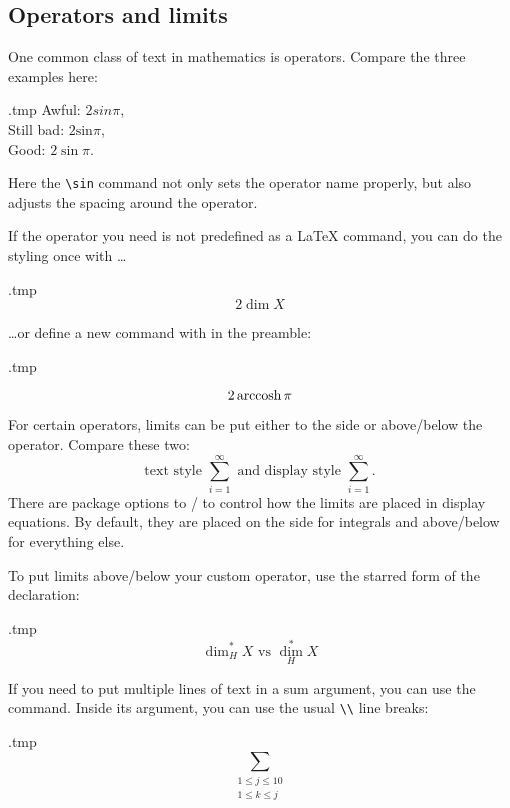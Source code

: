 %
%
\subsection{Operators and limits}\label{sec:operators}
One common class of text in mathematics is operators.
Compare the three examples here:
%
\begin{VerbatimOut}{\jobname.tmp}
Awful: $2 sin \pi$,\\
Still bad: $2 \textrm{sin} \pi$,\\
Good: $2 \sin \pi$.
\end{VerbatimOut}
\ShowExample
Here the \verb|\sin| command not only sets the operator name properly,
but also adjusts the spacing around the operator.

If the operator you need is not predefined as a \LaTeX{} command,
you can do the styling once with \dots
%
\begin{VerbatimOut}{\jobname.tmp}
\[
2 \operatorname{dim} X
\]
\end{VerbatimOut}
\ShowExample
%
\dots{}or define a new command with  in the preamble:
%
\begin{VerbatimOut}{\jobname.tmp}

\[
2 \operatorname{arccosh} \pi
\]
\end{VerbatimOut}
\ShowExample

For certain operators, limits can be put either to the side or above/below the operator.
Compare these two:
\[
\text{text style }\textstyle \sum_{i=1}^\infty
\text{ and display style }\displaystyle \sum_{i=1}^\infty.
\]
There are package options to /
to control how the limits are placed in display equations.
By default, they are placed on the side for integrals and above/below for everything else.

To put limits above/below your custom operator, use the starred form of the declaration:
%
\begin{VerbatimOut}{\jobname.tmp}
\[
\operatorname{dim}_H^\ast X
\text{ vs }
\operatorname*{dim}_H^\ast X
\]
\end{VerbatimOut}
\ShowExample

If you need to put multiple lines of text in a sum argument,
you can use the  command.
Inside its argument, you can use the usual \verb|\\| line breaks:
%
\begin{VerbatimOut}{\jobname.tmp}
\[
\sum_{\substack{1 \leq j \leq 10\\ 1 \leq k \leq j}}
\]
\end{VerbatimOut}
\ShowExample

